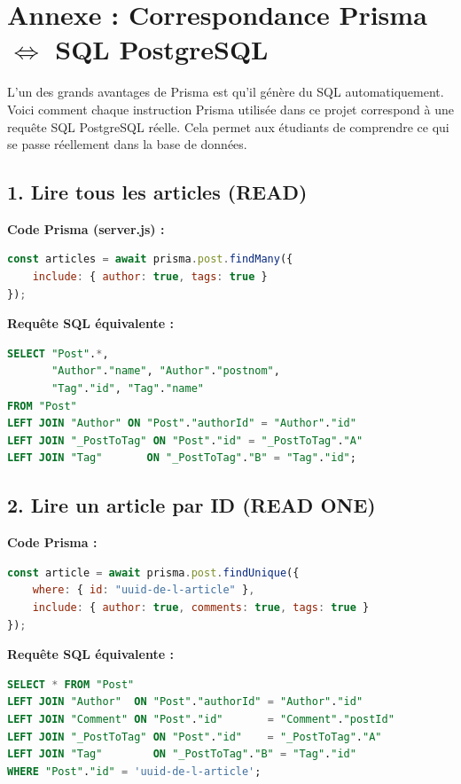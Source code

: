 \newpage
\section*{Annexe : Correspondance Prisma $\Leftrightarrow$ SQL PostgreSQL}

L'un des grands avantages de Prisma est qu'il génère du SQL automatiquement. Voici comment chaque instruction Prisma utilisée dans ce projet correspond à une requête SQL PostgreSQL réelle. Cela permet aux étudiants de comprendre ce qui se passe réellement dans la base de données.

\subsection*{1. Lire tous les articles (READ)}

\textbf{Code Prisma (server.js) :}
\begin{lstlisting}[language=JavaScript]
const articles = await prisma.post.findMany({
    include: { author: true, tags: true }
});
\end{lstlisting}

\textbf{Requête SQL équivalente :}
\begin{lstlisting}[language=SQL]
SELECT "Post".*,
       "Author"."name", "Author"."postnom",
       "Tag"."id", "Tag"."name"
FROM "Post"
LEFT JOIN "Author" ON "Post"."authorId" = "Author"."id"
LEFT JOIN "_PostToTag" ON "Post"."id" = "_PostToTag"."A"
LEFT JOIN "Tag"       ON "_PostToTag"."B" = "Tag"."id";
\end{lstlisting}

\subsection*{2. Lire un article par ID (READ ONE)}

\textbf{Code Prisma :}
\begin{lstlisting}[language=JavaScript]
const article = await prisma.post.findUnique({
    where: { id: "uuid-de-l-article" },
    include: { author: true, comments: true, tags: true }
});
\end{lstlisting}

\textbf{Requête SQL équivalente :}
\begin{lstlisting}[language=SQL]
SELECT * FROM "Post"
LEFT JOIN "Author"  ON "Post"."authorId" = "Author"."id"
LEFT JOIN "Comment" ON "Post"."id"       = "Comment"."postId"
LEFT JOIN "_PostToTag" ON "Post"."id"    = "_PostToTag"."A"
LEFT JOIN "Tag"        ON "_PostToTag"."B" = "Tag"."id"
WHERE "Post"."id" = 'uuid-de-l-article';
\end{lstlisting}

